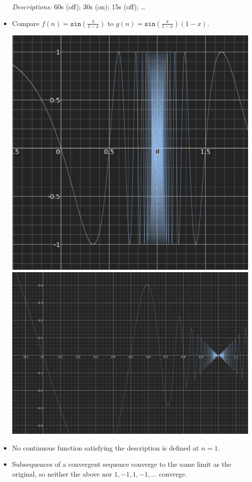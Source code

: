 \documentclass[a4paper, 11pt]{article} %
\begin{document}
\begin{itemize}
  \item[\it Descriptions:] 60s (off); 30s (on); 15s (off); \ldots
    \item Compare $f(n)=\texttt{sin}(\frac{\pi}{1-x})$ to $g(n)=\texttt{sin}(\frac{\pi}{1-x})(1-x)$.
      \begin{multicols}{2}
        \includegraphics[scale=.16]{Lamp}
        \includegraphics[scale=.1]{LampDec}
      \end{multicols}
    \item No continuous function satisfying the description is defined at $n=1$.
    \item Subsequences of a convergent sequence converge to the same limit as the original, so neither the above nor $1, -1, 1, -1, \ldots$ converge.
\end{itemize}
\end{document}
